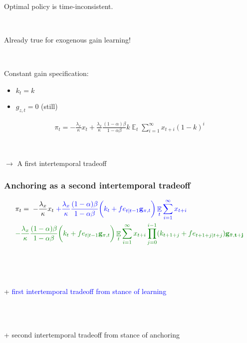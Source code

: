 \documentclass[11pt]{beamer}
\DeclareMathOperator{\E}{\mathbb{E}}
\begin{document}
\begin{frame}
	\frametitle{}

\begin{corollary} Optimal policy is time-inconsistent. 
\end{corollary}

\

Already true for exogenous gain learning!  

\

Constant gain specification:

\begin{itemize}
\item $k_t = k$
\item $g_{z,t} = 0$ (still)
\end{itemize}


\begin{align}
\pi_t  = -\frac{\lambda_x}{\kappa} x_t + \frac{\lambda_x}{\kappa} \frac{(1-\alpha)\beta}{1-\alpha\beta} k
\E_t\sum_{i=1}^{\infty}x_{t+i}(1-k)^i 
 \label{target_molnar} %
\end{align}


\

$\rightarrow$ A first intertemporal tradeoff
\end{frame}

\begin{frame}
	\frametitle{Anchoring as a second intertemporal tradeoff}
\small{
\begin{align*}
& \pi_t  =  \; -\frac{\lambda_x}{\kappa} x_t \textcolor{blue}{ \; + \frac{\lambda_x}{\kappa} \frac{(1-\alpha)\beta}{1-\alpha\beta} \bigg(k_t+ fe_{t|t-1}\mathbf{g}_{\pi,t} \bigg)\E_t\sum_{i=1}^{\infty}x_{t+i}}  \\
& \textcolor{mygreen}{- \frac{\lambda_x}{\kappa} \frac{(1-\alpha)\beta}{1-\alpha\beta} \bigg(k_t+ fe_{t|t-1}\mathbf{g}_{\pi,t} \bigg)\E_t\sum_{i=1}^{\infty}x_{t+i}\prod_{j=0}^{i-1}(k_{t+1+j}+ fe_{t+1+j|t+j})\mathbf{g_{\bar{\pi},t+j}} }
\end{align*}

\

\

+ \textcolor{blue}{first intertemporal tradeoff from stance of learning} \\

\

\

+ \textcolor{mygreen}{second intertemporal tradeoff from stance of anchoring}
}
\end{frame}
\end{document}
